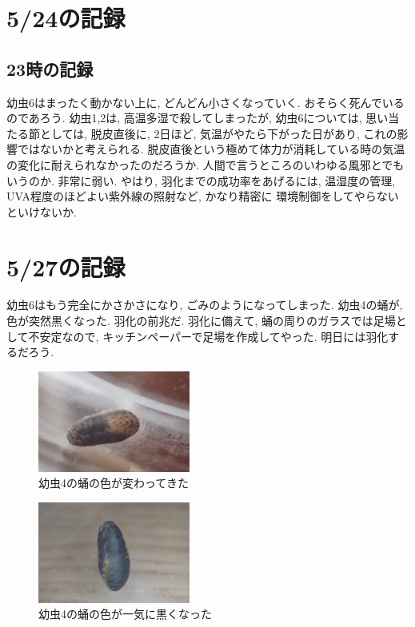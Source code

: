 \documentclass{jsarticle}
\begin{document}
\section{5/24の記録}
\subsection{23時の記録}
幼虫6はまったく動かない上に, どんどん小さくなっていく. おそらく死んでいるのであろう. 
幼虫1,2は, 高温多湿で殺してしまったが, 幼虫6については, 思い当たる節としては, 脱皮直後に, 2日ほど, 
気温がやたら下がった日があり, これの影響ではないかと考えられる. 
脱皮直後という極めて体力が消耗している時の気温の変化に耐えられなかったのだろうか. 
人間で言うところのいわゆる風邪とでもいうのか. 非常に弱い. 
やはり, 羽化までの成功率をあげるには, 温湿度の管理, UVA程度のほどよい紫外線の照射など, かなり精密に
環境制御をしてやらないといけないか. 

\section{5/27の記録}
幼虫6はもう完全にかさかさになり, ごみのようになってしまった. 
幼虫4の蛹が, 色が突然黒くなった. 羽化の前兆だ. 
羽化に備えて, 蛹の周りのガラスでは足場として不安定なので, キッチンペーパーで足場を作成してやった. 明日には羽化するだろう. 


\begin{figure}[htbp]
  \begin{center}
    \includegraphics[width=5cm]{photo11/Larva4-pupa1.JPG}
  \end{center}
  \caption{幼虫4の蛹の色が変わってきた}
\end{figure}

\begin{figure}[htbp]
  \begin{center}
    \includegraphics[width=5cm]{photo11/Larva4-pupa2.JPG}
  \end{center}
  \caption{幼虫4の蛹の色が一気に黒くなった}
\end{figure}
\end{document}
